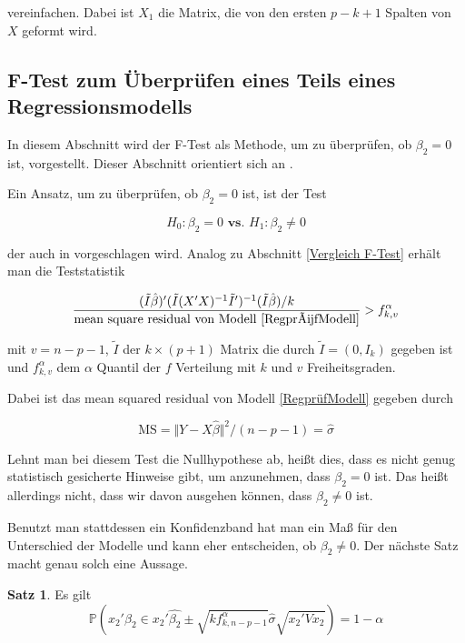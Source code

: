 \documentclass[12pt,a4paper]{article}
\theoremstyle{definition}
\theoremstyle{definition}
\newtheorem{Satz}[Definition]{Satz}
\theoremstyle{definition}
\theoremstyle{definition}
\begin{document}
vereinfachen. Dabei ist $X_1$ die Matrix, die von den ersten $p-k+1$ Spalten von $X$ geformt wird.

\subsection{F-Test zum Überprüfen eines Teils eines Regressionsmodells}
\label{F-Test-Teil}
In diesem Abschnitt wird der F-Test als Methode, um zu überprüfen, ob $\beta_2=0$ ist, vorgestellt. Dieser Abschnitt orientiert sich an \cite[100-102]{Liu64}.

Ein Ansatz, um zu überprüfen, ob $\beta_2=0$ ist, ist der Test 

\begin{equation} \label{Test_prüfen}
H_{0} : \beta_{2} = 0  \textbf{ vs. }  H_{1} : \beta_{2} \neq 0
\end{equation}

der auch in \cite{Draper98} vorgeschlagen wird. Analog zu Abschnitt \ref{Vergleich F-Test} erhält man die Teststatistik

\begin{equation*}
\frac{(\tilde{I}\hat{\beta})'(\tilde{I}(X'X)^{-1}\tilde{I}')^{-1}(\tilde{I}\hat{\beta})/k}{\text{mean square residual von Modell \eqref{RegprüfModell}}} > f^{\alpha}_{k,v}
\end{equation*}

mit $v=n-p-1$, $\tilde{I}$ der $k \times (p+1)$ Matrix die durch $\tilde{I}=(0,I_k)$ gegeben ist und $f^{\alpha}_{k,v}$ dem $\alpha$ Quantil der $f$ Verteilung mit $k$ und $v$ Freiheitsgraden.

Dabei ist das mean squared residual von Modell \eqref{RegprüfModell} gegeben durch

\begin{equation*}
\text{MS} = \Vert Y - X\hat{\beta} \Vert^2 / (n-p-1) = \hat{\sigma}
\end{equation*}

Lehnt man bei diesem Test die Nullhypothese ab, heißt dies, dass es nicht genug statistisch gesicherte Hinweise gibt, um anzunehmen, dass $\beta_{2} = 0$ ist. Das heißt allerdings nicht, dass wir davon ausgehen können, dass $\beta_2 \neq 0$ ist. 

Benutzt man stattdessen ein Konfidenzband hat man ein Maß für den Unterschied der Modelle und kann eher entscheiden, ob $\beta_2 \neq 0$. Der nächste Satz macht genau solch eine Aussage.

\begin{Satz}
Es gilt
\begin{equation} \label{KB_R_prüfen}
\mathbb{P} \left( x_2'\beta_2 \in x_2'\hat{\beta_2} \pm \sqrt{k f^{\alpha}_{k,n-p-1}} \hat{\sigma} \sqrt{x_2' V x_2} \right) = 1 - \alpha
\end{equation}
\end{Satz}
\end{document}
